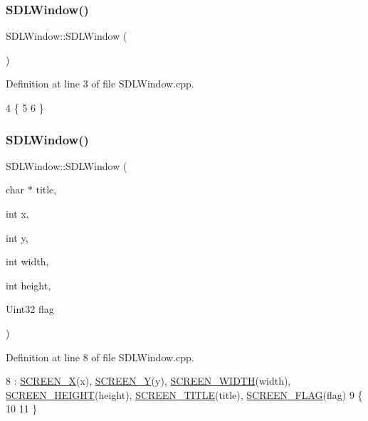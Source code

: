 \subsubsection{\texorpdfstring{S\+D\+L\+Window()}{SDLWindow()}\hspace{0.1cm}{\footnotesize\ttfamily [1/2]}}
{\footnotesize\ttfamily S\+D\+L\+Window\+::\+S\+D\+L\+Window (\begin{DoxyParamCaption}{ }\end{DoxyParamCaption})}



Definition at line 3 of file S\+D\+L\+Window.\+cpp.


\begin{DoxyCode}
4 \{
5 
6 \}
\end{DoxyCode}
\mbox{\label{class_s_d_l_window_a9f42587fe7eeda9b87e060bf74891338}} 
\subsubsection{\texorpdfstring{S\+D\+L\+Window()}{SDLWindow()}\hspace{0.1cm}{\footnotesize\ttfamily [2/2]}}
{\footnotesize\ttfamily S\+D\+L\+Window\+::\+S\+D\+L\+Window (\begin{DoxyParamCaption}\item[{char $\ast$}]{title,  }\item[{int}]{x,  }\item[{int}]{y,  }\item[{int}]{width,  }\item[{int}]{height,  }\item[{Uint32}]{flag }\end{DoxyParamCaption})}



Definition at line 8 of file S\+D\+L\+Window.\+cpp.


\begin{DoxyCode}
8                                                                                  : 
      \hyperlink{class_s_d_l_window_ade54e8777a5e5017b139b4559c791634}{SCREEN\_X}(x), \hyperlink{class_s_d_l_window_abdb8d6136e9724e854c491cb9eef054d}{SCREEN\_Y}(y), \hyperlink{class_s_d_l_window_ab3faec77de829876613ea52176ef61e1}{SCREEN\_WIDTH}(width), 
      \hyperlink{class_s_d_l_window_aed36cc4e541ecf78cda7e92f99a84d71}{SCREEN\_HEIGHT}(height), \hyperlink{class_s_d_l_window_afeb1a7d48dde026d437babea6667ebee}{SCREEN\_TITLE}(title), \hyperlink{class_s_d_l_window_a52d0a3b9ea7107e63476b24bc8a43397}{SCREEN\_FLAG}(flag)
9 \{
10 
11 \}
\end{DoxyCode}
\mbox{\label{class_s_d_l_window_a7a0af0daec54970ff2262b67a6ece281}} 
